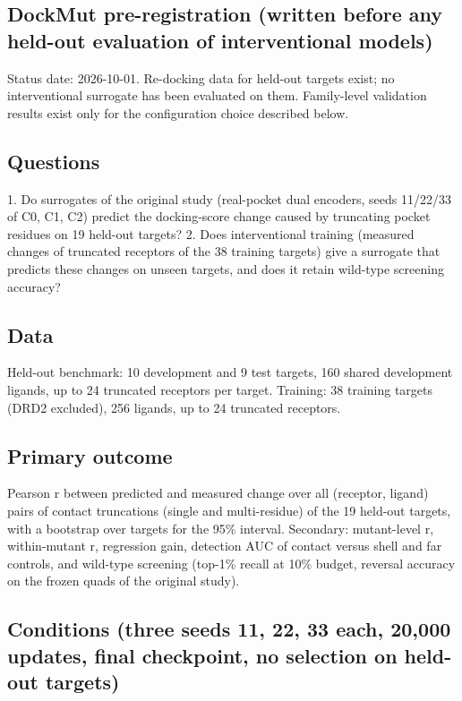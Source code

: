 \subsection*{DockMut pre-registration (written before any held-out evaluation of interventional models)}

Status date: 2026-10-01. Re-docking data for held-out targets exist; no interventional surrogate has been evaluated on them. Family-level validation results exist only for the configuration choice described below.

\subsection*{Questions}

1. Do surrogates of the original study (real-pocket dual encoders, seeds 11/22/33 of C0, C1, C2) predict the docking-score change caused by truncating pocket residues on 19 held-out targets? 2. Does interventional training (measured changes of truncated receptors of the 38 training targets) give a surrogate that predicts these changes on unseen targets, and does it retain wild-type screening accuracy?

\subsection*{Data}

Held-out benchmark: 10 development and 9 test targets, 160 shared development ligands, up to 24 truncated receptors per target. Training: 38 training targets (DRD2 excluded), 256 ligands, up to 24 truncated receptors.

\subsection*{Primary outcome}

Pearson r between predicted and measured change over all (receptor, ligand) pairs of contact truncations (single and multi-residue) of the 19 held-out targets, with a bootstrap over targets for the 95\% interval. Secondary: mutant-level r, within-mutant r, regression gain, detection AUC of contact versus shell and far controls, and wild-type screening (top-1\% recall at 10\% budget, reversal accuracy on the frozen quads of the original study).

\subsection*{Conditions (three seeds 11, 22, 33 each, 20,000 updates, final checkpoint, no selection on held-out targets)}

